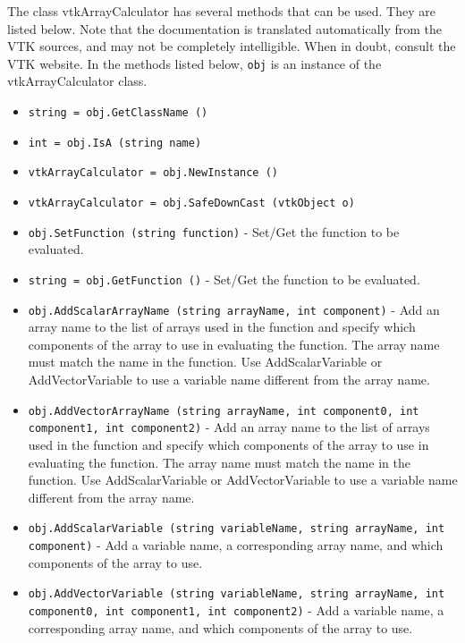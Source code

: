 The class vtkArrayCalculator has several methods that can be used.
  They are listed below.
Note that the documentation is translated automatically from the VTK sources,
and may not be completely intelligible.  When in doubt, consult the VTK website.
In the methods listed below, \verb|obj| is an instance of the vtkArrayCalculator class.
\begin{itemize}
\item  \verb|string = obj.GetClassName ()|

\item  \verb|int = obj.IsA (string name)|

\item  \verb|vtkArrayCalculator = obj.NewInstance ()|

\item  \verb|vtkArrayCalculator = obj.SafeDownCast (vtkObject o)|

\item  \verb|obj.SetFunction (string function)| -  Set/Get the function to be evaluated.

\item  \verb|string = obj.GetFunction ()| -  Set/Get the function to be evaluated.

\item  \verb|obj.AddScalarArrayName (string arrayName, int component)| -  Add an array name to the list of arrays used in the function and specify
 which components of the array to use in evaluating the function.  The
 array name must match the name in the function.  Use AddScalarVariable or
 AddVectorVariable to use a variable name different from the array name.

\item  \verb|obj.AddVectorArrayName (string arrayName, int component0, int component1, int component2)| -  Add an array name to the list of arrays used in the function and specify
 which components of the array to use in evaluating the function.  The
 array name must match the name in the function.  Use AddScalarVariable or
 AddVectorVariable to use a variable name different from the array name.

\item  \verb|obj.AddScalarVariable (string variableName, string arrayName, int component)| -  Add a variable name, a corresponding array name, and which components of
 the array to use.

\item  \verb|obj.AddVectorVariable (string variableName, string arrayName, int component0, int component1, int component2)| -  Add a variable name, a corresponding array name, and which components of
 the array to use.


\end{itemize}

